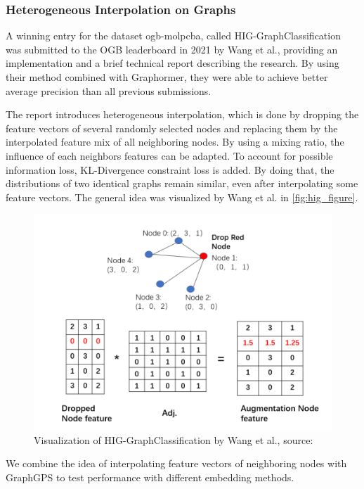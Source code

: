 \subsubsection{Heterogeneous Interpolation on Graphs}
A winning entry for the dataset ogb-molpcba, called HIG-GraphClassification~\cite{tencenc2021Hig,tencenc2021HigPaper} was submitted to the OGB leaderboard in 2021 by Wang et al., providing an implementation and a brief technical report describing the research. By using their method combined with Graphormer, they were able to achieve better average precision than all previous submissions.

The report introduces heterogeneous interpolation, which is done by dropping the feature vectors of several randomly selected nodes and replacing them by the interpolated feature mix of all neighboring nodes.
By using a mixing ratio, the influence of each neighbors features can be adapted. To account for possible information loss, KL-Divergence constraint loss is added. By doing that, the distributions of two identical graphs remain similar, even after interpolating some feature vectors. The general idea was visualized by Wang et al. in \autoref{fig:hig_figure}.

\begin{figure}[ht!]
    \centering
    \includegraphics[scale=0.3]{tex/res/hig_figure.png}
    \caption{Visualization of HIG-GraphClassification by Wang et al., \tiny{source: \cite{tencenc2021HigPaper}}}
    \label{fig:hig_figure}
\end{figure}

We combine the idea of interpolating feature vectors of neighboring nodes with GraphGPS to test performance with different embedding methods.